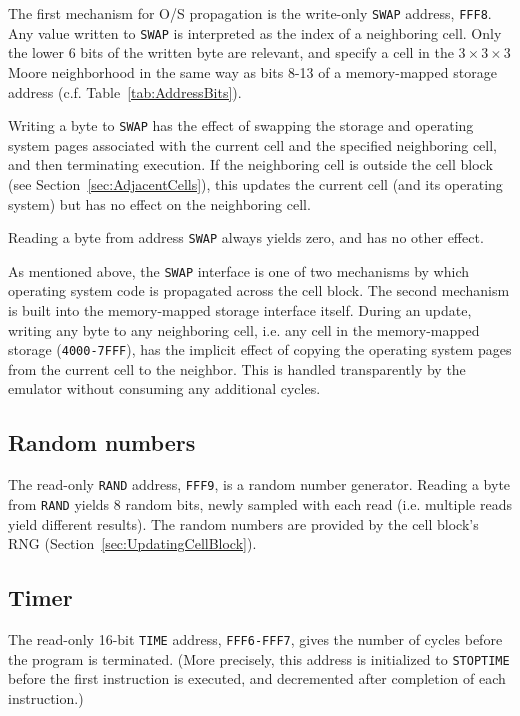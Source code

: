 \documentclass{article}
\newcommand\code[1]{{\tt #1}}
\newcommand\hex[1]{{\tt #1}}
\newcommand\hexrange[2]{\hex{#1}{\tt -}\hex{#2}}
\begin{document}
The first mechanism for O/S propagation is the write-only \code{SWAP} address, \hex{FFF8}.
Any value written to \code{SWAP} is interpreted as the index of a neighboring cell.
Only the lower 6 bits of the written byte are relevant, and specify a cell in the $3 \times 3 \times 3$ Moore neighborhood
in the same way as bits 8-13 of a memory-mapped storage address (c.f. Table~\ref{tab:AddressBits}).

Writing a byte to \code{SWAP} has the effect of swapping the storage and operating system pages associated with the current cell and the specified neighboring cell,
and then terminating execution.
If the neighboring cell is outside the cell block (see Section~\ref{sec:AdjacentCells}),
this updates the current cell (and its operating system) but has no effect on the neighboring cell.

Reading a byte from address \code{SWAP} always yields zero, and has no other effect.

As mentioned above, the \code{SWAP} interface is one of two mechanisms by which operating system code is propagated across the cell block.
The second mechanism is built into the memory-mapped storage interface itself.
During an update, writing any byte to any neighboring cell, i.e. any cell in the memory-mapped storage (\hexrange{4000}{7FFF}),
has the implicit effect of copying the operating system pages from the current cell to the neighbor.
This is handled transparently by the emulator without consuming any additional cycles.

\subsection{Random numbers}

The read-only \code{RAND} address, \hex{FFF9}, is a random number generator.
Reading a byte from \code{RAND} yields 8 random bits, newly sampled with each read (i.e. multiple reads yield different results).
The random numbers are provided by the cell block's RNG (Section~\ref{sec:UpdatingCellBlock}).

\subsection{Timer}

The read-only 16-bit \code{TIME} address, \hexrange{FFF6}{FFF7}, gives the number of cycles before the program is terminated.
(More precisely, this address is initialized to \code{STOPTIME} before the first instruction is executed,
and decremented after completion of each instruction.)
\end{document}
